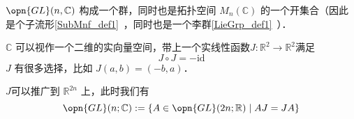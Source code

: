 $\opn{GL}(n, \mathbb{C})$ 构成一个群，同时也是拓扑空间 $M_n(\mathbb{C})$ 的一个开集合（因此是个子流形\autoref{SubMnf_def1}~，同时也是一个李群\autoref{LieGrp_def1}~）．

$\mathbb{C}$ 可以视作一个二维的实向量空间，带上一个实线性函数$J: \mathbb{R}^2 \to \mathbb{R}^2$满足
$$
J \circ J = -\text{id}
$$
$J$ 有很多选择，比如 $J(a, b) = (-b, a)$．

$J$可以推广到 $\mathbb{R}^{2 n}$ 上，此时我们有
$$
\opn{GL}(n; \mathbb{C}): = \{A \in \opn{GL}(2 n; \mathbb{R}) \mid A J = J A \}
$$





